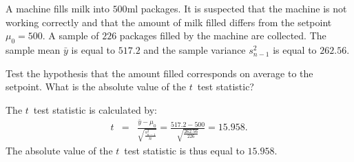 
\begin{question}
A machine fills milk into $500$ml packages. It is suspected that the 
machine is not working correctly and that the amount of milk filled differs 
from the setpoint $\mu_0 = 500$. A sample of $226$ packages 
filled by the machine are collected. The sample mean $\bar{y}$ is equal to 
$517.2$ and the sample variance $s^2_{n-1}$ is equal to 
$262.56$.

Test the hypothesis that the amount filled corresponds on average to the 
setpoint. What is the absolute value of the $t$~test statistic?
\end{question}

\begin{solution}
The $t$~test statistic is calculated by:
\begin{eqnarray*}
  t & = & \frac{\bar y - \mu_0}{\sqrt{\frac{s^2_{n-1}}{n}}}
  = \frac{517.2 - 500}{\sqrt{\frac{262.56}{226}}}
  = 15.958.
\end{eqnarray*}
The absolute value of the $t$~test statistic is thus equal to
$15.958$.
\end{solution}

